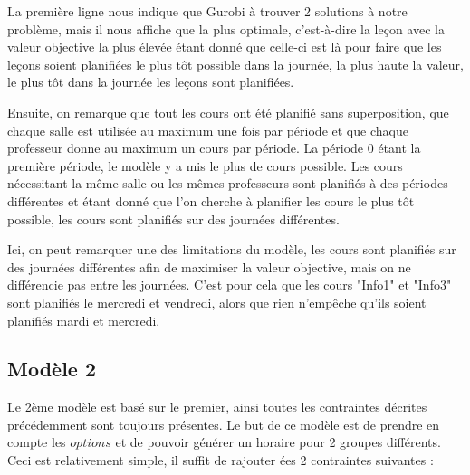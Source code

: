 La première ligne nous indique que Gurobi à trouver 2 solutions à notre problème, mais il nous affiche que la plus optimale, c'est-à-dire la leçon avec la valeur objective la plus élevée étant donné que celle-ci est là pour faire que les leçons soient planifiées le plus tôt possible dans la journée, la plus haute la valeur, le plus tôt dans la journée les leçons sont planifiées.

Ensuite, on remarque que tout les cours ont été planifié sans superposition, que chaque salle est utilisée au maximum une fois par période et que chaque professeur donne au maximum un cours par période. La période 0 étant la première période, le modèle y a mis le plus de cours possible. Les cours nécessitant la même salle ou les mêmes professeurs sont planifiés à des périodes différentes et étant donné que l'on cherche à planifier les cours le plus tôt possible, les cours sont planifiés sur des journées différentes.

Ici, on peut remarquer une des limitations du modèle, les cours sont planifiés sur des journées différentes afin de maximiser la valeur objective, mais on ne différencie pas entre les journées. C'est pour cela que les cours "Info1" et "Info3" sont planifiés le mercredi et vendredi, alors que rien n'empêche qu'ils soient planifiés mardi et mercredi.

\subsection{Modèle 2}
Le 2ème modèle est basé sur le premier, ainsi toutes les contraintes décrites précédemment sont toujours présentes. Le but de ce modèle est de prendre en compte les $options$ et de pouvoir générer un horaire pour 2 groupes différents. Ceci est relativement simple, il suffit de rajouter ées 2 contraintes suivantes :

